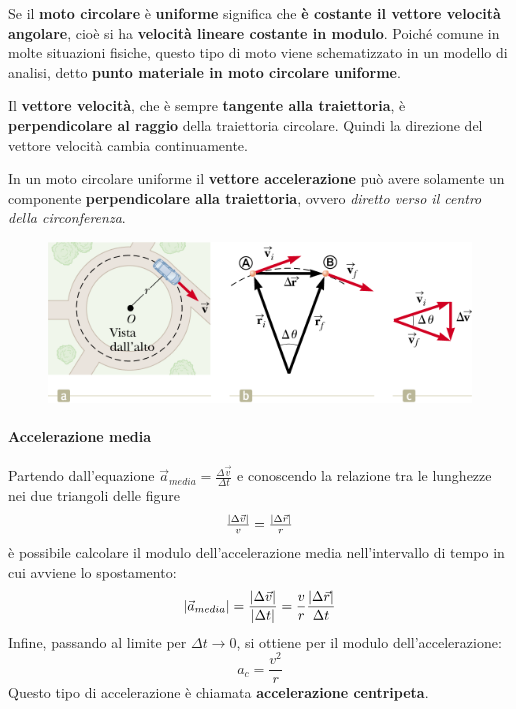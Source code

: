 \documentclass[a4paper,11pt,oneside]{book}
\begin{document}
Se il \textbf{moto circolare} è \textbf{uniforme} significa che \textbf{è costante il vettore velocità angolare}, cioè si ha \textbf{velocità lineare costante in modulo}. 
Poiché comune in molte situazioni fisiche, questo tipo di moto viene schematizzato in un modello di analisi, detto \textbf{punto materiale in moto circolare uniforme}.

Il \textbf{vettore velocità}, che è sempre \textbf{tangente alla traiettoria}, è \textbf{perpendicolare al raggio} della traiettoria circolare. Quindi la direzione del vettore velocità cambia continuamente.

In un moto circolare uniforme il \textbf{vettore accelerazione} può avere solamente un componente \textbf{perpendicolare alla traiettoria}, ovvero \emph{diretto verso il centro della circonferenza}.
\begin{figure}[h]
    \centering
    \includegraphics[scale=0.5]{moto_circolare_uniforme}    
\end{figure}

\paragraph{Accelerazione media}
Partendo dall'equazione $\vec{a}_{media} = \tfrac{\Delta \vec{v}}{\Delta t}$ e conoscendo la relazione tra le lunghezze nei due triangoli delle figure
\begin{equation*}
    \tfrac{\abs{\Delta \vec{v}}}{v} = \tfrac{\abs{\Delta \vec{r}}}{r}
\end{equation*}
è possibile calcolare il modulo dell'accelerazione media nell'intervallo di tempo in cui avviene lo spostamento:
\begin{equation*}
    \abs{\vec{a}_{media}} = \frac{\abs{\Delta \vec{v}}}{\abs{\Delta t}} = \frac{v}{r}\frac{\abs{\Delta \vec{r}}}{\Delta t}
\end{equation*}
Infine, passando al limite per $\Delta t \to 0$, si ottiene per il modulo dell'accelerazione:
\begin{equation*}
    a_c = \frac{v^2}{r}
\end{equation*}
Questo tipo di accelerazione è chiamata \textbf{accelerazione centripeta}.
\end{document}
